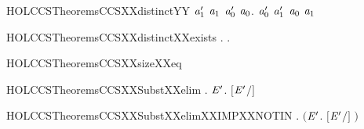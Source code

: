 \begin{SaveVerbatim}{HOLCCSTheoremsCCSXXdistinctYY}
   \HOLSymConst{\HOLTokenForall{}}\ensuremath{\HOLBoundVar{a}\sb{\mathrm{1}}\sp{\prime{}}} \ensuremath{\HOLBoundVar{a}\sb{\mathrm{1}}} \ensuremath{\HOLBoundVar{a}\sb{\mathrm{0}}\sp{\prime{}}} \ensuremath{\HOLBoundVar{a}\sb{\mathrm{0}}}.  \ensuremath{\HOLBoundVar{a}\sb{\mathrm{0}}\sp{\prime{}}} \ensuremath{\HOLBoundVar{a}\sb{\mathrm{1}}\sp{\prime{}}} \HOLSymConst{\HOLTokenNotEqual{}}  \ensuremath{\HOLBoundVar{a}\sb{\mathrm{0}}} \ensuremath{\HOLBoundVar{a}\sb{\mathrm{1}}}
\end{SaveVerbatim}
\newcommand{\HOLCCSTheoremsCCSXXdistinctYY}{\UseVerbatim{HOLCCSTheoremsCCSXXdistinctYY}}
\begin{SaveVerbatim}{HOLCCSTheoremsCCSXXdistinctXXexists}
\HOLTokenTurnstile{} \HOLSymConst{\HOLTokenForall{}}. \HOLSymConst{\HOLTokenExists{}}.  \HOLSymConst{\HOLTokenNotEqual{}} 
\end{SaveVerbatim}
\newcommand{\HOLCCSTheoremsCCSXXdistinctXXexists}{\UseVerbatim{HOLCCSTheoremsCCSXXdistinctXXexists}}
\begin{SaveVerbatim}{HOLCCSTheoremsCCSXXsizeXXeq}
\HOLTokenTurnstile{} 
\end{SaveVerbatim}
\newcommand{\HOLCCSTheoremsCCSXXsizeXXeq}{\UseVerbatim{HOLCCSTheoremsCCSXXsizeXXeq}}
\begin{SaveVerbatim}{HOLCCSTheoremsCCSXXSubstXXelim}
\HOLTokenTurnstile{} \HOLSymConst{\HOLTokenForall{}} .  \HOLConst{\HOLTokenNotIn{}}   \HOLSymConst{\HOLTokenImp{}} \HOLSymConst{\HOLTokenForall{}}\ensuremath{\HOLBoundVar{E}\sp{\prime{}}}. \ensuremath{[}\ensuremath{\HOLBoundVar{E}\sp{\prime{}}}\ensuremath{/}\ensuremath{]}  \HOLSymConst{\ensuremath{=}} 
\end{SaveVerbatim}
\newcommand{\HOLCCSTheoremsCCSXXSubstXXelim}{\UseVerbatim{HOLCCSTheoremsCCSXXSubstXXelim}}
\begin{SaveVerbatim}{HOLCCSTheoremsCCSXXSubstXXelimXXIMPXXNOTIN}
\HOLTokenTurnstile{} \HOLSymConst{\HOLTokenForall{}} . \ensuremath{(}\HOLSymConst{\HOLTokenForall{}}\ensuremath{\HOLBoundVar{E}\sp{\prime{}}}. \ensuremath{[}\ensuremath{\HOLBoundVar{E}\sp{\prime{}}}\ensuremath{/}\ensuremath{]}  \HOLSymConst{\ensuremath{=}} \ensuremath{)} \HOLSymConst{\HOLTokenImp{}}  \HOLConst{\HOLTokenNotIn{}}  
\end{SaveVerbatim}
